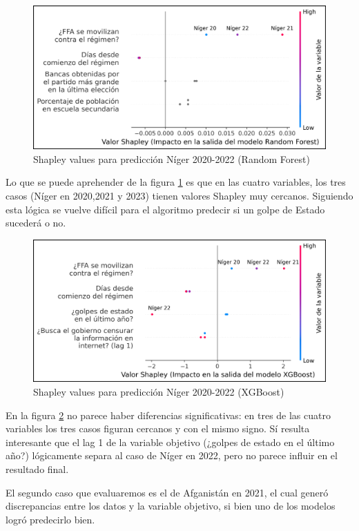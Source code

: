 \documentclass{article}
\begin{document}
\begin{figure}[H]
 \centering
 \includegraphics[width=.75\textwidth]{11_shapley_values_rf_niger.png}
 \caption{Shapley values para predicción Níger 2020-2022 (Random Forest)\label{fig:shapley_rf_niger}}
\end{figure}

Lo que se puede aprehender de la figura \ref{fig:shapley_rf_niger} es que en las cuatro variables,
los tres casos (Níger en 2020,2021 y 2023) tienen valores Shapley muy cercanos. Siguiendo esta lógica
se vuelve difícil para el algoritmo predecir si un golpe de Estado sucederá o no.

\begin{figure}[H]
 \centering
 \includegraphics[width=.75\textwidth]{12_shapley_values_xgb_niger.png}
 \caption{Shapley values para predicción Níger 2020-2022 (XGBoost)\label{fig:shapley_xgb_niger}}
\end{figure}

En la figura \ref{fig:shapley_xgb_niger} no parece haber diferencias significativas: en tres de las
cuatro variables los tres casos figuran cercanos y con el mismo signo. Sí resulta interesante que el
lag 1 de la variable objetivo (¿golpes de estado en el último año?) lógicamente separa al caso de
Níger en 2022, pero no parece influir en el resultado final.

El segundo caso que evaluaremos es el de Afganistán en 2021, el cual generó discrepancias entre los
datos y la variable objetivo, si bien uno de los modelos logró predecirlo bien.
\end{document}
